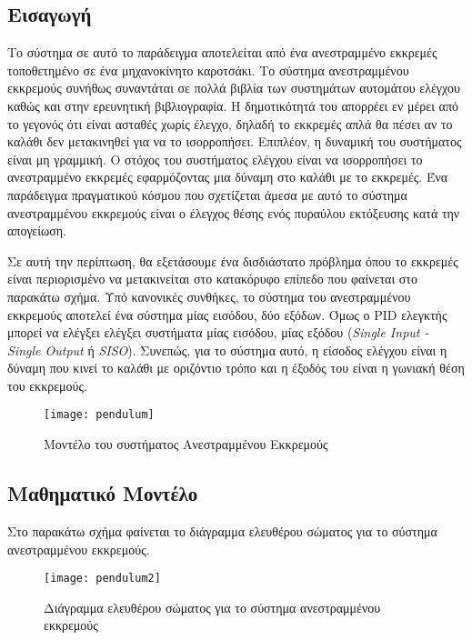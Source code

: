 \subsection{Εισαγωγή}

Το σύστημα σε αυτό το παράδειγμα αποτελείται από ένα ανεστραμμένο εκκρεμές τοποθετημένο σε ένα μηχανοκίνητο καροτσάκι. Το σύστημα ανεστραμμένου εκκρεμούς συνήθως συναντάται σε πολλά βιβλία των συστημάτων αυτομάτου ελέγχου καθώς και στην ερευνητική βιβλιογραφία. Η δημοτικότητά του απορρέει εν μέρει από το γεγονός ότι είναι ασταθές χωρίς έλεγχο, δηλαδή το εκκρεμές απλά θα πέσει αν το καλάθι δεν μετακινηθεί για να το ισορροπήσει. Επιπλέον, η δυναμική του συστήματος είναι μη γραμμική. Ο στόχος του συστήματος ελέγχου είναι να ισορροπήσει το ανεστραμμένο εκκρεμές εφαρμόζοντας μια δύναμη στο καλάθι με το εκκρεμές. Ένα παράδειγμα πραγματικού κόσμου που σχετίζεται άμεσα με αυτό το σύστημα ανεστραμμένου εκκρεμούς είναι ο έλεγχος θέσης ενός πυραύλου εκτόξευσης κατά την απογείωση.

Σε αυτή την περίπτωση, θα εξετάσουμε ένα δισδιάστατο πρόβλημα όπου το εκκρεμές είναι περιορισμένο να μετακινείται στο κατακόρυφο επίπεδο που φαίνεται στο παρακάτω σχήμα. Υπό κανονικές συνθήκες, το σύστημα του ανεστραμμένου εκκρεμούς αποτελεί ένα σύστημα μίας εισόδου, δύο εξόδων. Όμως ο PID ελεγκτής μπορεί να ελέγξει ελέγξει συστήματα μίας εισόδου, μίας εξόδου (\emph{Single Input - Single Output} ή \emph{SISO}). Συνεπώς, για το σύστημα αυτό, η είσοδος ελέγχου είναι η δύναμη που κινεί το καλάθι με οριζόντιο τρόπο και η έξοδός του είναι η γωνιακή θέση του εκκρεμούς.

\begin{figure}[h]
  \centering
  \texttt{[image: pendulum]}
  \caption{Μοντέλο του συστήματος Ανεστραμμένου Εκκρεμούς}
  \label{fig:pendulum}
\end{figure}

\subsection{Μαθηματικό Μοντέλο}

Στο παρακάτω σχήμα φαίνεται το διάγραμμα ελευθέρου σώματος για το σύστημα ανεστραμμένου εκκρεμούς.

\begin{figure}[h]
  \centering
  \texttt{[image: pendulum2]}
  \caption{Διάγραμμα ελευθέρου σώματος για το σύστημα ανεστραμμένου εκκρεμούς}
  \label{fig:pendulum2}
\end{figure}

